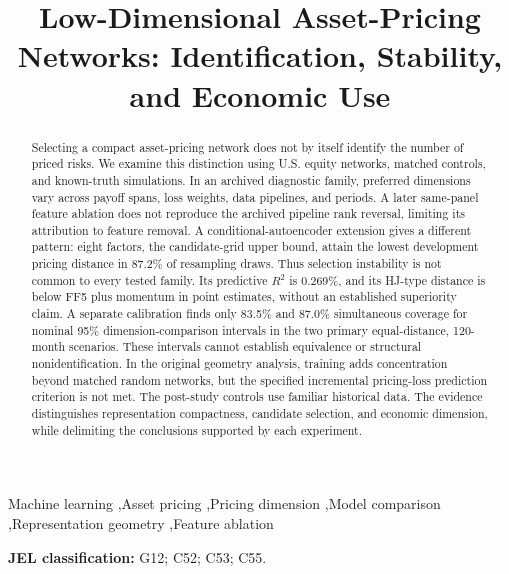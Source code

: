 \documentclass[preprint,12pt,authoryear]{elsarticle}
\begin{document}
\begin{frontmatter}
\title{Low-Dimensional Asset-Pricing Networks: Identification, Stability, and Economic Use}




\begin{abstract}
Selecting a compact asset-pricing network does not by itself identify the number of priced risks. We examine this distinction using U.S. equity networks, matched controls, and known-truth simulations. In an archived diagnostic family, preferred dimensions vary across payoff spans, loss weights, data pipelines, and periods. A later same-panel feature ablation does not reproduce the archived pipeline rank reversal, limiting its attribution to feature removal. A conditional-autoencoder extension gives a different pattern: eight factors, the candidate-grid upper bound, attain the lowest development pricing distance in 87.2\% of resampling draws. Thus selection instability is not common to every tested family. Its predictive $R^2$ is 0.269\%, and its HJ-type distance is below FF5 plus momentum in point estimates, without an established superiority claim. A separate calibration finds only 83.5\% and 87.0\% simultaneous coverage for nominal 95\% dimension-comparison intervals in the two primary equal-distance, 120-month scenarios. These intervals cannot establish equivalence or structural nonidentification. In the original geometry analysis, training adds concentration beyond matched random networks, but the specified incremental pricing-loss prediction criterion is not met. The post-study controls use familiar historical data. The evidence distinguishes representation compactness, candidate selection, and economic dimension, while delimiting the conclusions supported by each experiment.
\end{abstract}

\begin{keyword}
Machine learning \sep Asset pricing \sep Pricing dimension \sep Model comparison \sep Representation geometry \sep Feature ablation
\end{keyword}

\end{frontmatter}
\raggedbottom
\ifdefined\IREFREADER\pagestyle{irefreader}\fi

\noindent\textbf{JEL classification:} G12; C52; C53; C55.








\end{document}
